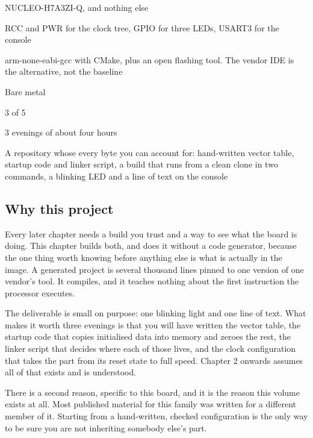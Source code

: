 
\begin{keyfacts}
\item[Board] NUCLEO-H7A3ZI-Q, and nothing else
\item[Peripherals] RCC and PWR for the clock tree, GPIO for three LEDs, USART3 for the console
\item[Toolchain] arm-none-eabi-gcc with CMake, plus an open flashing tool. The vendor IDE is the alternative, not the baseline
\item[Operating system] Bare metal
\item[Difficulty] 3 of 5
\item[Effort] 3 evenings of about four hours
\item[Deliverable] A repository whose every byte you can account for: hand-written vector table, startup code and linker script, a build that runs from a clean clone in two commands, a blinking LED and a line of text on the console
\end{keyfacts}

\subsection*{Why this project}

Every later chapter needs a build you trust and a way to see what the board is
doing. This chapter builds both, and does it without a code generator, because
the one thing worth knowing before anything else is what is actually in the
image. A generated project is several thousand lines pinned to one version of
one vendor's tool. It compiles, and it teaches nothing about the first
instruction the processor executes.

The deliverable is small on purpose: one blinking light and one line of text.
What makes it worth three evenings is that you will have written the vector
table, the startup code that copies initialised data into memory and zeroes the
rest, the linker script that decides where each of those lives, and the clock
configuration that takes the part from its reset state to full speed. Chapter 2
onwards assumes all of that exists and is understood.

There is a second reason, specific to this board, and it is the reason this
volume exists at all. Most published material for this family was written for a
different member of it. Starting from a hand-written, checked configuration is
the only way to be sure you are not inheriting somebody else's part.


